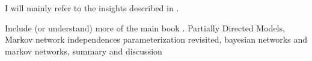 I will mainly refer to the insights described in \cite{koller2009probabilistic}.

Include (or understand) more of the main book \cite{koller2009probabilistic}. Partially Directed Models, Markov network independences parameterization revisited, bayesian networks and markov networks, summary and discussion
